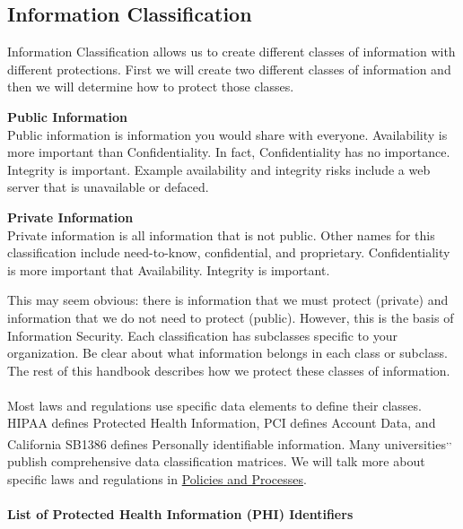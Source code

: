 \subsection{Information Classification}
Information Classification allows us to create different classes of information with different protections. First we will create two different classes of information and then we will determine how to protect those classes.
\begin{description}
\item\textbf{Public Information}\\ Public information is information you would share with everyone. Availability is more important than Confidentiality. In fact, Confidentiality has no importance. Integrity is important. Example availability and integrity risks include a web server that is unavailable or defaced.
\item\textbf{Private Information}\\ Private information is all information that is not public. Other names for this classification include need-to-know, confidential, and proprietary. Confidentiality is more important that Availability. Integrity is important.
\end{description}
This may seem obvious: there is information that we must protect (private) and information that we do not need to protect (public). However, this is the basis of Information Security. Each classification has subclasses specific to your organization. Be clear about what information belongs in each class or subclass. The rest of this handbook describes how we protect these classes of information.\\\\Most laws and regulations use specific data elements to define their classes. HIPAA defines Protected Health Information, PCI defines Account Data, and California SB1386 defines Personally identifiable information. Many universities\textsuperscript{,}\textsuperscript{,} publish comprehensive data classification matrices. We will talk more about specific laws and regulations in \hyperref[sec:"Policies and Processes"]{Policies and Processes}.\\\\
\textbf{List of Protected Health Information (PHI) Identifiers}
